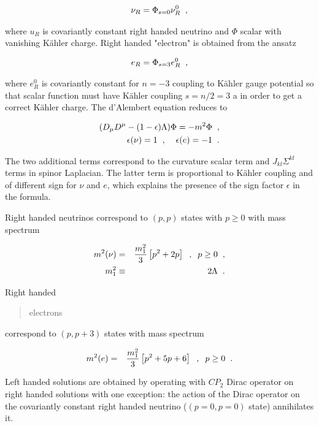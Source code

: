 \documentclass[10pt,epsf]{article}
\begin{document}
\begin{eqnarray}
 \nu_R= \Phi_{s=0} \nu^0_R \hspace{.2cm} , 
 \end{eqnarray}
 
\noindent where $u_R$ is covariantly constant right handed neutrino and $\Phi$ scalar with vanishing K\"ahler charge. Right handed "electron" is obtained from the ansatz 
 
\begin{eqnarray}
 e_R= \Phi_{s=3} e_R^0\hspace{.2cm} ,
 \end{eqnarray}
 

\noindent where $e_R^0$ is covariantly constant for $n=-3$ coupling to K\"ahler gauge potential so that scalar function must have K\"ahler coupling $s=n/2=3$ a in order to get a  correct K\"ahler charge.  The d'Alembert equation reduces to

\begin{eqnarray} (D_{\mu}D^{\mu} - (1 - \epsilon) \Lambda)\Phi =-m^2\Phi\per ,\nonumber\\ \epsilon (\nu)=1 \per , \per \per \epsilon (e)=-1\per . \end{eqnarray}

\noindent The two additional terms correspond to the curvature scalar term and $J_{kl}\Sigma^{kl}$ terms in spinor   Laplacian. The latter term is proportional to K\"ahler coupling and of different sign for $\nu$ and $e$, which explains the presence of the sign factor $\epsilon$ in the formula.




Right handed neutrinos correspond to $(p,p)$ states with $p\geq 0$ with mass spectrum

\begin{eqnarray} m^2(\nu)&=& \frac{m_1^2}{3}\left[p^2+ 2 p \right] \hspace{.2cm} ,\hspace{.2cm}  p\geq 0\hspace{.2cm} ,\nonumber\\ m_1^2&\equiv& 2\Lambda \hspace{.2cm} . \end{eqnarray}

\noindent Right handed \blockquote{electrons} correspond to $(p,p+3)$ states with mass spectrum


\begin{eqnarray} m^2(e)&=& \frac{m_1^2}{3}\left[p^2+ 5 p +6\right] \hspace{.2cm} ,\hspace{.2cm}  p\geq 0\hspace{.2cm} . \end{eqnarray}

\noindent Left handed solutions are obtained by operating with $CP_2$ Dirac operator on right handed solutions with one exception: the action of the Dirac operator on the covariantly constant  right handed neutrino ($(p=0,p=0)$ state)  annihilates it.
\end{document}
